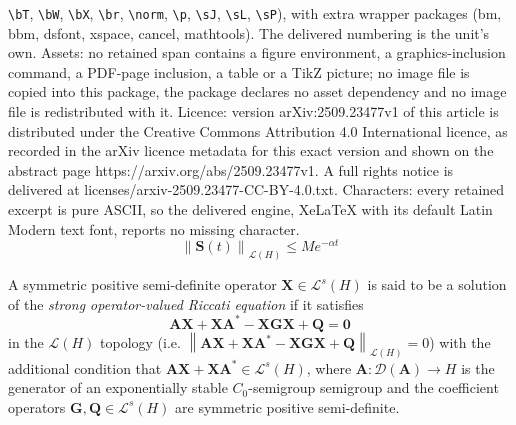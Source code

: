 \documentclass[10pt,a4paper]{amsart}
\newcommand{\ARE}{\bA \bX + \bX \bA^* - \bX \bG \bX + \bQ}
\newcommand{\bA}{\mathbf A}
\newcommand{\bG}{\mathbf G}
\newcommand{\bQ}{\mathbf Q}
\newcommand{\bS}{\mathbf S}
\newcommand{\bX}{\mathbf X}
\newcommand{\norm}[1]{\left\| #1 \right\|}
\newcommand{\sL}{\mathscr L}
\begin{document}
\texttt{\textbackslash bT}, \texttt{\textbackslash bW}, \texttt{\textbackslash bX}, \texttt{\textbackslash br}, \texttt{\textbackslash norm}, \texttt{\textbackslash p}, \texttt{\textbackslash sJ}, \texttt{\textbackslash sL}, \texttt{\textbackslash sP}), with extra wrapper packages (bm, bbm, dsfont, xspace, cancel, mathtools). The delivered numbering is the unit's own. Assets: no retained span contains a figure environment, a graphics-inclusion command, a PDF-page inclusion, a table or a TikZ picture; no image file is copied into this package, the package declares no asset dependency and no image file is redistributed with it. Licence: version arXiv:2509.23477v1 of this article is distributed under the Creative Commons Attribution 4.0 International licence, as recorded in the arXiv licence metadata for this exact version and shown on the abstract page https://arxiv.org/abs/2509.23477v1. A full rights notice is delivered at licenses/arxiv-2509.23477-CC-BY-4.0.txt. Characters: every retained excerpt is pure ASCII, so the delivered engine, XeLaTeX with its default Latin Modern text font, reports no missing character.
\begin{equation} \label{eqn: exponential stability bound}
    \norm{\bS(t)}_{\sL(H)} \leq Me^{-\alpha t}
\end{equation}

\begin{definition}
    A symmetric positive semi-definite operator $\bX \in \sL^s(H)$ is said to be a solution of the \emph{strong operator-valued Riccati equation} if it satisfies
    \begin{equation} \label{eqn: strong ARE}
        \ARE = \mathbf 0 
    \end{equation} 
    in the $\sL(H)$ topology (i.e. $\norm{\ARE}_{\sL(H)} = 0$) with the additional condition that $\bA\bX + \bX\bA^* \in \sL^s(H)$, where $\bA: \mathcal D(\bA) \rightarrow H$ is the generator of an exponentially stable $C_0$-semigroup semigroup and the coefficient operators $\bG,\bQ \in \sL^s(H)$ are symmetric positive semi-definite.
\end{definition}
\end{document}
